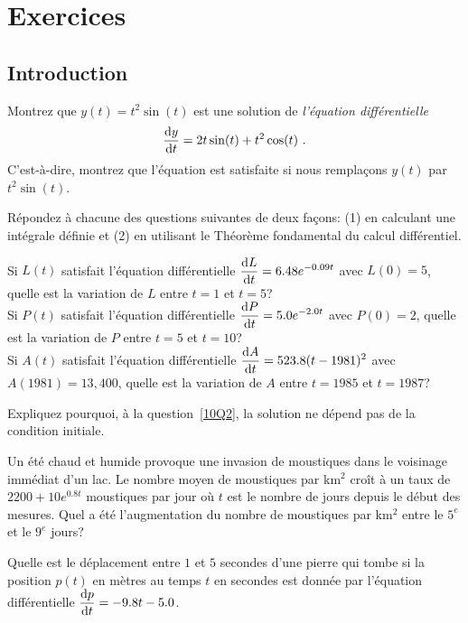 \section{Exercices}

\subsection{Introduction}

\begin{question}[\eng \life]
Montrez que $y(t) = t^2\sin(t)$ est une solution de {\em l'équation
différentielle} 
\[
\dydx{y}{t} = 2t\sin(t) + t^2\cos(t) \ .
\]
C'est-à-dire, montrez que l'équation est satisfaite si nous remplaçons
$y(t)$ par $t^2\sin(t)$.
\label{10Q1}
\end{question}

\begin{question}
Répondez à chacune des questions suivantes de deux façons:  (1) en
calculant une intégrale définie et (2) en utilisant le Théorème
fondamental du calcul différentiel.

 Si $L(t)$ satisfait l'équation différentielle
$\displaystyle \frac{\mathrm{d}L}{\mathrm{d}t} = 6.48 e^{-0.09t}$ avec $L(0)=5$, quelle
est la variation de $L$ entre $t=1$ et $t=5$?\\
 Si $P(t)$ satisfait l'équation différentielle
$\displaystyle \frac{\mathrm{d}P}{\mathrm{d}t} = 5.0 e^{-2.0t}$ avec $P(0)=2$, quelle
est la variation de $P$ entre $t=5$ et $t=10$?\\
 Si $A(t)$ satisfait l'équation différentielle 
$\displaystyle \frac{\mathrm{d}A}{\mathrm{d}t} = 523.8 (t-1981)^2$ avec $A(1981) = 13,400$,
quelle est la variation de $A$ entre $t=1985$ et $t=1987$?
\label{10Q2}
\end{question}

\begin{question}
Expliquez pourquoi, à la question~\ref{10Q2}, la solution ne
dépend pas de la condition initiale.
\label{10Q3}
\end{question}

\begin{question}[\life]
Un été chaud et humide provoque une invasion de moustiques dans le
voisinage immédiat d'un lac.  Le nombre moyen de moustiques par km$^2$
croît à un taux de $2200 + 10 e^{0.8t}$ moustiques par jour où $t$ est
le nombre de jours depuis le début des mesures.  Quel a été
l'augmentation du nombre de moustiques par km$^2$ entre le $5^e$ et le
$9^e$ jours? 
\label{10Q4}
\end{question}

\begin{question}
Quelle est le déplacement entre $1$ et $5$ secondes d'une pierre qui tombe si
la position $p(t)$ en mètres au temps $t$ en secondes est donnée par
l'équation différentielle $\displaystyle \frac{\mathrm{d}p}{\mathrm{d}t} = -9.8 t - 5.0$. 
\label{10Q5}
\end{question}


